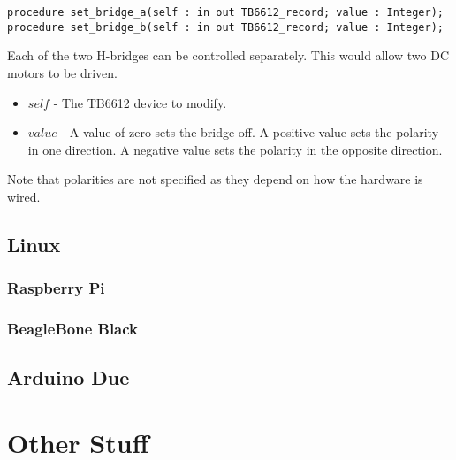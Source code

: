 \documentclass[10pt, openany]{book}
\newcommand{\comment}[1]{{\color{red}{#1}}}
\begin{document}
\begin{lstlisting}
procedure set_bridge_a(self : in out TB6612_record; value : Integer);
procedure set_bridge_b(self : in out TB6612_record; value : Integer);
\end{lstlisting}
Each of the two H-bridges can be controlled separately.  This would allow two DC motors to be driven.
\begin{itemize}
  \item $self$ - The TB6612 device to modify.
  \item $value$ - A value of zero sets the bridge off.  A positive value sets the polarity in one direction.  A negative value sets the polarity in the opposite direction.
\end{itemize}

Note that polarities are not specified as they depend on how the hardware is wired.

\section{Linux}
\subsection{Raspberry Pi}
\subsection{BeagleBone Black}

\section{Arduino Due}

\chapter{Other Stuff}
\comment{If there is anything else that should be added, additional chapters may be added as needed.}

\clearpage


\end{document}
